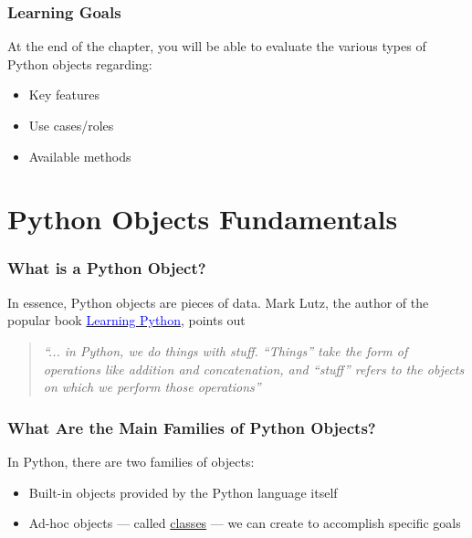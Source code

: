 \documentclass[aspectratio=1610]{beamer}
\begin{document}
\begin{frame}
    \frametitle{Learning Goals}
    At the end of the chapter, you will be able to evaluate the various types of Python objects regarding:
    \begin{itemize}
        \item Key features
        \item Use cases/roles
        \item Available methods
    \end{itemize}
\end{frame}

\section{Python Objects Fundamentals}


\begin{frame}
    \frametitle{What is a Python Object?}
    
    In essence, Python objects are pieces of data. Mark Lutz, the author of the popular book \href{https://www.google.co.uk/books/edition/Learning_Python/4pgQfXQvekcC?hl=en&gbpv=0}{\textcolor{blue}{Learning Python}}, points out

    \vspace{2em}
    
    \begin{quote}
    \textit{``... in Python, we do things with stuff. ``Things'' take the form of operations like addition and concatenation, and ``stuff'' refers to the objects on which we perform those operations''}
    \end{quote}

\end{frame}

\begin{frame}
    \frametitle{What Are the Main Families of Python Objects?}
    In Python, there are two families of objects:
    
    \begin{itemize}
        \item Built-in objects provided by the Python language itself
        \item Ad-hoc objects --- called \href{https://docs.python.org/3/tutorial/classes.html}{classes} --- we can create to accomplish specific goals
    \end{itemize}
    
    \end{frame}
\end{document}

